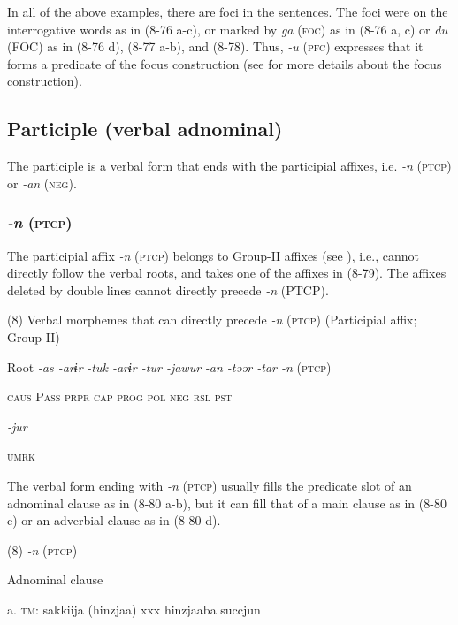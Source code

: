   In all of the above examples, there are foci in the sentences. The foci were on the interrogative words as in (8-76 a-c), or marked by \textit{ga} (\textsc{foc}) as in (8-76 a, c) or \textit{du} (FOC) as in (8-76 d), (8-77 a-b), and (8-78). Thus, \textit{{}-u} (\textsc{pfc}) expresses that it forms a predicate of the focus construction (see  for more details about the focus construction).

\subsection{Participle (verbal adnominal)}

The participle is a verbal form that ends with the participial affixes, i.e. \textit{{}-n} (\textsc{ptcp}) or \textit{{}-an} (\textsc{neg}).

\subsubsection{\textit{{}-n} (\textsc{ptcp})}

The participial affix \textit{{}-n} (\textsc{ptcp}) belongs to Group-II affixes (see ), i.e., cannot directly follow the verbal roots, and takes one of the affixes in (8-79). The affixes deleted by double lines cannot directly precede \textit{{}-n} (PTCP).

(8)  Verbal morphemes that can directly precede \textit{{}-n} (\textsc{ptcp}) (Participial affix; Group II)

  Root  \textit{{}-as  {}-arɨr} %
\textit{{}-tuk  {}-arɨr  {}-tur  {}-jawur} %
\textit{{}-an  {}-təər  {}-tar  {}-n} (\textsc{ptcp})

    \textsc{caus}  P\textsc{ass}  \textsc{prpr}  \textsc{cap}  \textsc{prog}  \textsc{pol}  \textsc{neg}  \textsc{rsl}  \textsc{pst}

          \textit{{}-jur} 

          \textsc{umrk}

The verbal form ending with \textit{{}-n} (\textsc{ptcp}) usually fills the predicate slot of an adnominal clause as in (8-80 a-b), but it can fill that of a main clause as in (8-80 c) or an adverbial clause as in (8-80 d).

(8)  \textit{{}-n} (\textsc{ptcp})

  Adnominal clause

  a.  \textsc{tm}:  sakkiija  (hinzjaa)  xxx  hinzjaaba  succjun

